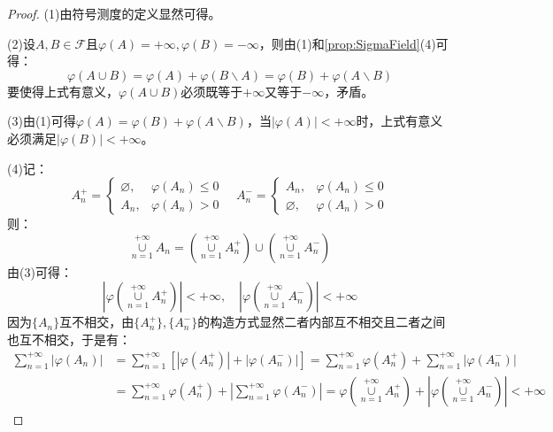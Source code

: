 \begin{proof}
	(1)由符号测度的定义显然可得。\par
	(2)设$A,B\in\mathscr{F}$且$\varphi(A)=+\infty,\varphi(B)=-\infty$，则由(1)和\cref{prop:SigmaField}(4)可得：
	\begin{equation*}
		\varphi(A\cup B)=\varphi(A)+\varphi(B\backslash A)=\varphi(B)+\varphi(A\backslash B)
	\end{equation*}
	要使得上式有意义，$\varphi(A\cup B)$必须既等于$+\infty$又等于$-\infty$，矛盾。\par
	(3)由(1)可得$\varphi(A)=\varphi(B)+\varphi(A\backslash B)$，当$|\varphi(A)|<+\infty$时，上式有意义必须满足$|\varphi(B)|<+\infty$。\par
	(4)记：
	\begin{equation*}
		A_n^+=
		\begin{cases}
			\varnothing,&\varphi(A_n)\leqslant0 \\
			A_n,&\varphi(A_n)>0
		\end{cases}
		\quad
		A_n^-=
		\begin{cases}
			A_n,&\varphi(A_n)\leqslant0 \\
			\varnothing,&\varphi(A_n)>0
		\end{cases}
	\end{equation*}
	则：
	\begin{equation*}
		\underset{n=1}{\overset{+\infty}{\cup}}A_n=\left(\underset{n=1}{\overset{+\infty}{\cup}}A_n^+\right)\cup\left(\underset{n=1}{\overset{+\infty}{\cup}}A_n^-\right)
	\end{equation*}
	由(3)可得：
	\begin{equation*}
		\left|\varphi\left(\underset{n=1}{\overset{+\infty}{\cup}}A_n^+\right)\right|<+\infty,\quad
		\left|\varphi\left(\underset{n=1}{\overset{+\infty}{\cup}}A_n^-\right)\right|<+\infty
	\end{equation*}
	因为$\{A_n\}$互不相交，由$\{A_n^+\},\{A_n^-\}$的构造方式显然二者内部互不相交且二者之间也互不相交，于是有：
	\begin{align*}
		\sum_{n=1}^{+\infty}|\varphi(A_n)|&=\sum_{n=1}^{+\infty}[|\varphi(A_n^+)|+|\varphi(A_n^-)|] =\sum_{n=1}^{+\infty}\varphi(A_n^+)+\sum_{n=1}^{+\infty}|\varphi(A_n^-)| \\
		&=\sum_{n=1}^{+\infty}\varphi(A_n^+)+\left|\sum_{n=1}^{+\infty}\varphi(A_n^-)\right|
		=\varphi\left(\underset{n=1}{\overset{+\infty}{\cup}}A_n^+\right)+\left|\varphi\left(\underset{n=1}{\overset{+\infty}{\cup}}A_n^-\right)\right|<+\infty
	\end{align*}\par

\end{proof}
